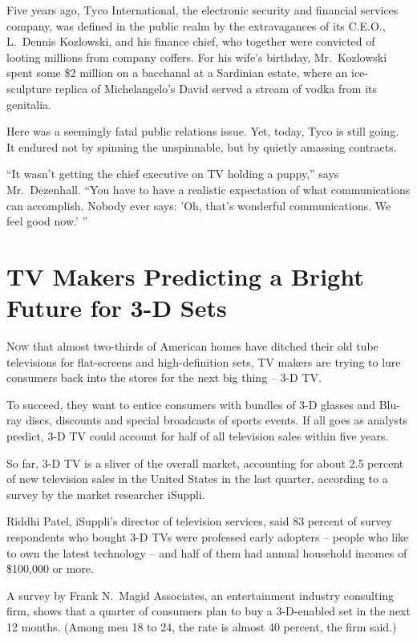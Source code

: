 ﻿\documentclass[12pt]{article}
\begin{document}
Five years ago, Tyco International, the electronic security and financial services company, was
defined in the public realm by the extravagances of its C.E.O., L.~Dennis Kozlowski, and his finance
chief, who together were convicted of looting millions from company coffers. For his wife's
birthday, Mr.~Kozlowski spent some \$2 million on a bacchanal at a Sardinian estate, where an
ice-sculpture replica of Michelangelo's David served a stream of vodka from its genitalia.

Here was a seemingly fatal public relations issue. Yet, today, Tyco is still going. It endured not
by spinning the unspinnable, but by quietly amassing contracts.

``It wasn't getting the chief executive on TV holding a puppy,'' says Mr.~Dezenhall. ``You have to
have a realistic expectation of what communications can accomplish. Nobody ever says: 'Oh, that's
wonderful communications. We feel good now.' ''

\pagebreak
\section{TV Makers Predicting a Bright Future for 3-D Sets}

\lettrine{N}{ow} that almost two-thirds of American homes have ditched their
old tube televisions for flat-screens and high-definition sets, TV makers are trying to lure
consumers back into the stores for the next big thing -- 3-D TV.

To succeed, they want to entice consumers with bundles of 3-D glasses and Blu-ray discs, discounts
and special broadcasts of sports events. If all goes as analysts predict, 3-D TV could account for
half of all television sales within five years.

So far, 3-D TV is a sliver of the overall market, accounting for about 2.5 percent of new television
sales in the United States in the last quarter, according to a survey by the market researcher
iSuppli.

Riddhi Patel, iSuppli's director of television services, said 83 percent of survey respondents who
bought 3-D TVs were professed early adopters -- people who like to own the latest technology -- and
half of them had annual household incomes of \$100,000 or more.

A survey by Frank N.~Magid Associates, an entertainment industry consulting firm, shows that a
quarter of consumers plan to buy a 3-D-enabled set in the next 12 months. (Among men 18 to 24, the
rate is almost 40 percent, the firm said.)
\end{document}
